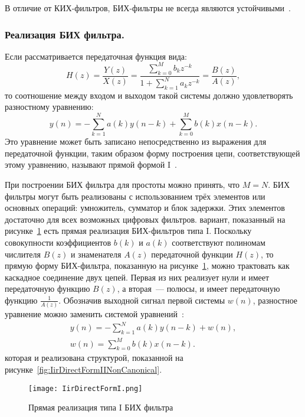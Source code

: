 В отличие от КИХ-фильтров, БИХ-фильтры не всегда являются устойчивыми~\cite{Wiki_IIR}.

\subsubsection{Реализация БИХ фильтра. }
Если рассматривается передаточная функция вида:
\begin{equation}
	H(z) = \frac{Y(z)}{X(z)} = \frac{\sum_ {k=0}^{M} b_{k} z ^{-k} } { 1 + \sum_ {k=1}^{N} a_{k} z ^{-k}} = \frac{B(z)}{A(z)}, 
\end{equation}
то соотношение между входом и выходом такой системы должно удовлетворять разностному уравнению:
\begin{equation}
	y(n) = -\sum_ {k=1}^N a(k)y(n - k) + \sum_ {k=0}^M b(k)x(n - k).
\end{equation}
Это уравнение может быть записано непосредственно из выражения для передаточной функции, таким образом форму построения цепи, соответствующей этому уравнению, называют прямой формой I~\cite{Wiki_IIR}.

При построении БИХ фильтра для простоты можно принять, что $M=N$. БИХ фильтры могут быть реализованы с использованием трёх элементов или основных операций: умножитель, сумматор и блок задержки. Этих элементов достаточно для всех возможных цифровых фильтров. вариант, показанный на рисунке~\ref{fig:IirDirectFormI} есть прямая реализация БИХ-фильтров типа I. Поскольку совокупности коэффициентов $b(k)$ и $a(k)$ соответствуют полиномам числителя $B(z)$ и знаменателя $A(z)$ передаточной функции $H(z)$, то прямую форму БИХ-фильтра, показанную на рисунке~\ref{fig:IirDirectFormI}, можно трактовать как каскадное соединение двух цепей. Первая из них реализует нули и имеет передаточную функцию $B(z)$, а вторая~--- полюсы, и имеет передаточную функцию $\frac{1}{A(z)}$. Обозначив выходной сигнал первой системы $w(n)$, разностное уравнение можно заменить системой уравнений~\cite{Wiki_IIR}:
\begin{gather}
	y(n) = - \sum_ {k=1}^{N} a(k)y(n - k) + w(n), \\
	w(n) = \sum_ {k=0}^{M} b(k)x(n - k).
\end{gather}
которая и реализована структурой, показанной на рисунке~\ref{fig:IirDirectFormIINonCanonical}.

\begin{figure}[ht]
	\centering
	\texttt{[image: IirDirectFormI.png]}  
	\caption{Прямая реализация типа I БИХ фильтра}
	\label{fig:IirDirectFormI}
\end{figure}

